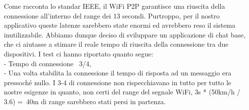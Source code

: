 \documentclass[conference]{IEEEtran}
\begin{document}
Come racconta lo standar IEEE, il WiFi P2P garantisce una riuscita della connessione all'interno del range dei 13 secondi. Purtroppo, per il nostro applicativo queste latenze sarebbero state enormi ed avrebbero reso il sistema inutilizzabile.
Abbiamo dunque deciso di sviluppare un applicazione di chat base, che ci aiutasse a stimare il reale tempo di riuscita della connessione tra due dispositivi.
I test ci hanno riportato quanto segue:
\\
- Tempo di connessione ~3/4,\\
- Una volta stabilita la connessione il tempo di risposta ad un messaggio era pressoch\'e nullo.
I 3-4 di connessione non rispecchiavano in tutto per tutto le nostre esigenze in quanto, non certi del range del segnale WiFi, 3s * (50km/h / 3.6) =~40m di range sarebbero stati persi in partenza.
\end{document}
